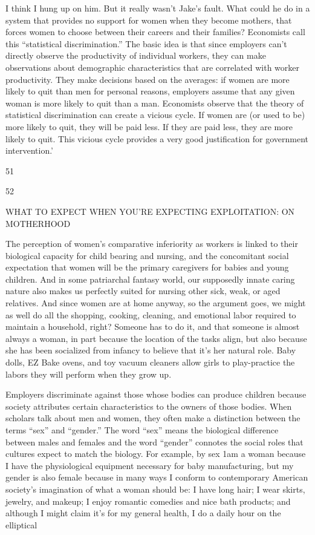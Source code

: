  \par 
I think I hung up on him. But it really wasn’t Jake’s fault. What could he do in a system that provides no support for women when they become mothers, that forces women to choose between their careers and their families? Economists call this “statistical discrimination.” The basic idea is that since employers can’t directly observe the productivity of individual workers, they can make observations about demographic characteristics that are correlated with worker productivity. They make decisions based on the averages: if women are more likely to quit than men for personal reasons, employers assume that any given woman is more likely to quit than a man. Economists observe that the theory of statistical discrimination can create a vicious cycle. If women are (or used to be) more likely to quit, they will be paid less. If they are paid less, they are more likely to quit. This vicious cycle provides a very good justification for government intervention.’
 \par 
51
 \par 
52
 \par 
WHAT TO EXPECT WHEN YOU'RE EXPECTING EXPLOITATION: ON MOTHERHOOD
 \par 
The perception of women’s comparative inferiority as workers is linked to their biological capacity for child bearing and nursing, and the concomitant social expectation that women will be the primary caregivers for babies and young children. And in some patriarchal fantasy world, our supposedly innate caring nature also makes us perfectly suited for nursing other sick, weak, or aged relatives. And since women are at home anyway, so the argument goes, we might as well do all the shopping, cooking, cleaning, and emotional labor required to maintain a household, right? Someone has to do it, and that someone is almost always a woman, in part because the location of the tasks align, but also because she has been socialized from infancy to believe that it’s her natural role. Baby dolls, EZ Bake ovens, and toy vacuum cleaners allow girls to play-practice the labors they will perform when they grow up.
 \par 
Employers discriminate against those whose bodies can produce children because society attributes certain characteristics to the owners of those bodies. When scholars talk about men and women, they often make a distinction between the terms “sex” and “gender.” The word “sex” means the biological difference between males and females and the word “gender” connotes the social roles that cultures expect to match the biology. For example, by sex 1am a woman because I have the physiological equipment necessary for baby manufacturing, but my gender is also female because in many ways I conform to contemporary American society’s imagination of what a woman should be: I have long hair; I wear skirts, jewelry, and makeup; I enjoy romantic comedies and nice bath products; and although I might claim it’s for my general health, I do a daily hour on the elliptical
